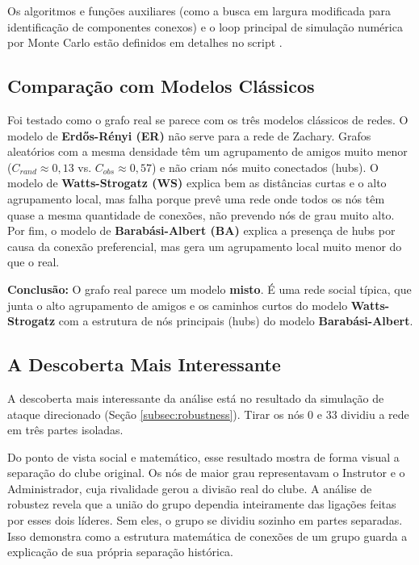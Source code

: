 \documentclass[sigconf,nonacm]{webmedia}
\begin{document}
Os algoritmos e funções auxiliares (como a busca em largura modificada para identificação de componentes conexos) e o loop principal de simulação numérica por Monte Carlo estão definidos em detalhes no script .

\subsection{Comparação com Modelos Clássicos}
\label{subsec:modelos_classicos}

Foi testado como o grafo real se parece com os três modelos clássicos de redes. O modelo de \textbf{Erdős-Rényi (ER)} não serve para a rede de Zachary. Grafos aleatórios com a mesma densidade têm um agrupamento de amigos muito menor ($C_{rand} \approx 0,13$ vs. $C_{obs} \approx 0,57$) e não criam nós muito conectados (hubs). O modelo de \textbf{Watts-Strogatz (WS)} explica bem as distâncias curtas e o alto agrupamento local, mas falha porque prevê uma rede onde todos os nós têm quase a mesma quantidade de conexões, não prevendo nós de grau muito alto. Por fim, o modelo de \textbf{Barabási-Albert (BA)} explica a presença de hubs por causa da conexão preferencial, mas gera um agrupamento local muito menor do que o real.

\textbf{Conclusão:} O grafo real parece um modelo \textbf{misto}. É uma rede social típica, que junta o alto agrupamento de amigos e os caminhos curtos do modelo \textbf{Watts-Strogatz} com a estrutura de nós principais (hubs) do modelo \textbf{Barabási-Albert}.

\subsection{A Descoberta Mais Interessante}
\label{subsec:descoberta_interessante}

A descoberta mais interessante da análise está no resultado da simulação de ataque direcionado (Seção \ref{subsec:robustness}). Tirar os nós $0$ e $33$ dividiu a rede em três partes isoladas. 

Do ponto de vista social e matemático, esse resultado mostra de forma visual a separação do clube original. Os nós de maior grau representavam o Instrutor e o Administrador, cuja rivalidade gerou a divisão real do clube. A análise de robustez revela que a união do grupo dependia inteiramente das ligações feitas por esses dois líderes. Sem eles, o grupo se dividiu sozinho em partes separadas. Isso demonstra como a estrutura matemática de conexões de um grupo guarda a explicação de sua própria separação histórica.
\end{document}
